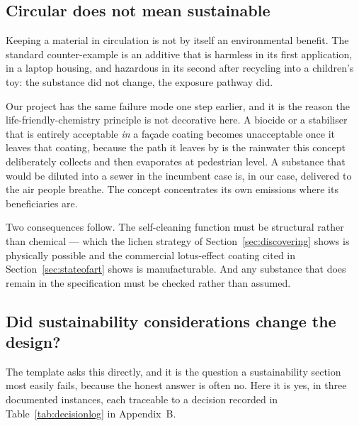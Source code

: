 \subsection{Circular does not mean sustainable}
\label{sec:leaching}

Keeping a material in circulation is not by itself an environmental benefit. The
standard counter-example is an additive that is harmless in its first
application, in a laptop housing, and hazardous in its second after recycling
into a children's toy: the substance did not change, the exposure pathway did.

Our project has the same failure mode one step earlier, and it is the reason the
life-friendly-chemistry principle is not decorative here. A biocide or a
stabiliser that is entirely acceptable \emph{in} a façade coating becomes
unacceptable once it leaves that coating, because the path it leaves by is the
rainwater this concept deliberately collects and then evaporates at pedestrian
level. A substance that would be diluted into a sewer in the incumbent case is,
in our case, delivered to the air people breathe. The concept concentrates its
own emissions where its beneficiaries are.

Two consequences follow. The self-cleaning function must be structural rather
than chemical --- which the lichen strategy of Section~\ref{sec:discovering}
shows is physically possible and the commercial lotus-effect coating cited in
Section~\ref{sec:stateofart} shows is manufacturable. And any substance that does
remain in the specification must be checked rather than assumed.


\subsection{Did sustainability considerations change the design?}

The template asks this directly, and it is the question a sustainability section
most easily fails, because the honest answer is often no. Here it is yes, in
three documented instances, each traceable to a decision recorded in
Table~\ref{tab:decisionlog} in Appendix~B.

